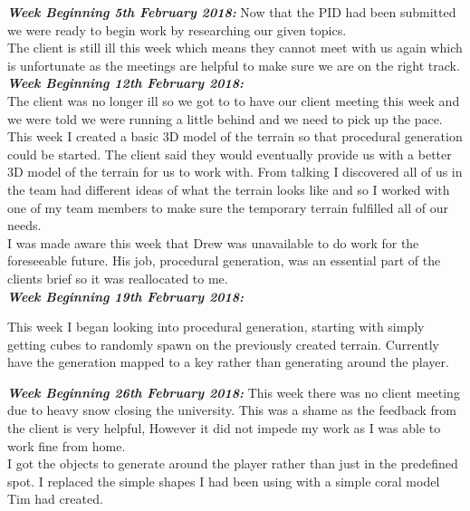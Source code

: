 \documentclass[10pt, a4paper]{article}
\begin{document}
    \textbf{\textit{Week Beginning 5th February 2018:}}
    Now that the PID had been submitted we were ready to begin work by researching our given topics.\\
    
    The client is still ill this week which means they cannot meet with us again which is unfortunate as the meetings are helpful to make sure we are on the right track.\\
    
    \textbf{\textit{Week Beginning 12th February 2018:}}\\
    The client was no longer ill so we got to to have our client meeting this week and we were told we were running a little behind and we need to pick up the pace.\\
    
    This week I created a basic 3D model of the terrain so that procedural generation could be started. The client said they would eventually provide us with a better 3D model of the terrain for us to work with. From talking I discovered all of us in the team had different ideas of what the terrain looks like and so I worked with one of my team members to make sure the temporary terrain fulfilled all of our needs.\\
    
   	I was made aware this week that Drew was unavailable to do work for the foreseeable future. His job, procedural generation, was an essential part of the clients brief so it was reallocated to me.\\
   	
    \textbf{\textit{Week Beginning 19th February 2018:}}
    
    This week I began looking into procedural generation, starting with simply getting cubes to randomly spawn on the previously created terrain. Currently have the generation mapped to a key rather than generating around the player.
    
    \textbf{\textit{Week Beginning 26th February 2018:}}
    This week there was no client meeting due to heavy snow closing the university. This was a shame as the feedback from the client is very helpful, However it did not impede my work as I was able to work fine from home.\\
    
    I got the objects to generate around the player rather than just in the predefined spot. I replaced the simple shapes I had been using with a simple coral model Tim had created.\\
   	
\end{document}
